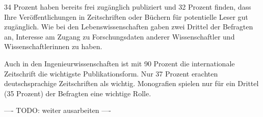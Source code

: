 34 Prozent haben bereits frei zugänglich publiziert und 32 Prozent finden, dass Ihre Veröffentlichungen in Zeitschriften oder Büchern für potentielle Leser gut zugänglich. Wie bei den Lebenswissenschaften gaben zwei Drittel der Befragten an, Interesse am Zugang zu Forschungsdaten anderer Wissenschaftler und Wissenschaftlerinnen zu haben.

Auch in den Ingenieurwissenschaften ist mit 90 Prozent die internationale Zeitschrift die wichtigste Publikationsform. Nur 37 Prozent erachten deutschsprachige Zeitschriften als wichtig. Monografien spielen nur für ein Drittel (35 Prozent) der Befragten eine wichtige Rolle.

---- TODO: weiter ausarbeiten ----
